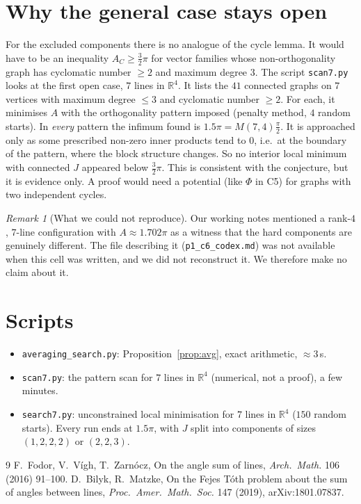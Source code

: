 \documentclass[11pt]{article}
\theoremstyle{remark}
\newtheorem{remark}[theorem]{Remark}
\begin{document}
\section{Why the general case stays open}
For the excluded components there is no analogue of the cycle lemma. It would have to be an inequality
$A_C\ge\frac32\pi$ for vector families whose non-orthogonality graph has cyclomatic number $\ge2$ and
maximum degree $3$. The script \texttt{scan7.py} looks at the first open case, $7$ lines in
$\mathbb R^4$. It lists the $41$ connected graphs on $7$ vertices with maximum degree $\le3$ and
cyclomatic number $\ge2$. For each, it minimises $A$ with the orthogonality pattern imposed (penalty
method, $4$ random starts). In \emph{every} pattern the infimum found is $1.5\pi=M(7,4)\frac\pi2$. It is
approached only as some prescribed non-zero inner products tend to $0$, i.e.\ at the boundary of the
pattern, where the block structure changes. So no interior local minimum with connected $J$ appeared
below $\frac32\pi$. This is consistent with the conjecture, but it is evidence only. A proof would need
a potential (like $\Phi$ in C5) for graphs with two independent cycles.

\begin{remark}[What we could not reproduce]
Our working notes mentioned a rank-$4$, $7$-line configuration with $A\approx1.702\pi$ as a witness that
the hard components are genuinely different. The file describing it (\texttt{p1\_c6\_codex.md}) was not
available when this cell was written, and we did not reconstruct it. We therefore make no claim about it.
\end{remark}

\section*{Scripts}
\begin{itemize}
\item \texttt{averaging\_search.py}: Proposition~\ref{prop:avg}, exact arithmetic, $\approx3$\,s.
\item \texttt{scan7.py}: the pattern scan for $7$ lines in $\mathbb R^4$ (numerical, not a proof),
  a few minutes.
\item \texttt{search7.py}: unconstrained local minimisation for $7$ lines in $\mathbb R^4$ ($150$ random
  starts). Every run ends at $1.5\pi$, with $J$ split into components of sizes $(1,2,2,2)$ or
  $(2,2,3)$.
\end{itemize}

\begin{thebibliography}{9}
 F.~Fodor, V.~V\'igh, T.~Zarn\'ocz, On the angle sum of lines, \emph{Arch.\ Math.} 106
(2016) 91--100.
 D.~Bilyk, R.~Matzke, On the Fejes T\'oth problem about the sum of angles between lines,
\emph{Proc.\ Amer.\ Math.\ Soc.} 147 (2019), arXiv:1801.07837.
\end{thebibliography}
\end{document}
